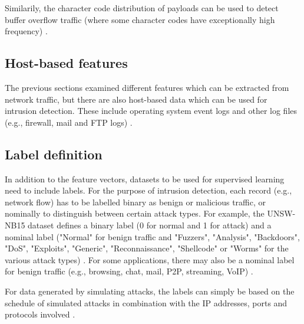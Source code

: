 \documentclass[conference]{IEEEtran}
\begin{document}
Similarily, the character code distribution of payloads can be used to detect buffer overflow traffic (where some character codes have exceptionally high frequency) \cite{waizumi2007}.

\subsection{Host-based features}

The previous sections examined different features which can be extracted from network traffic, but there are also host-based data which can be used for intrusion detection. These include operating system event logs \cite{Ids2018} and other log files (e.g., firewall, mail and FTP logs) \cite{abad2003}.

\subsection*{Label definition}

In addition to the feature vectors, datasets to be used for supervised learning need to include labels. For the purpose of intrusion detection, each record (e.g., network flow) has to be labelled  binary as benign or malicious traffic, or nominally to distinguish between certain attack types. For example, the UNSW-NB15 dataset defines a binary label (0 for normal and 1 for attack) and a nominal label ("Normal" for benign traffic and "Fuzzers", "Analysis", "Backdoors", "DoS", "Exploits", "Generic", "Reconnaissance", "Shellcode" or "Worms" for the various attack types) \cite{Nb2015}. For some applications, there may also be a nominal label for benign traffic (e.g., browsing, chat, mail, P2P, streaming, VoIP) \cite{lashkari2017} \cite{bagui2017}.

For data generated by simulating attacks, the labels can simply be based on the schedule of simulated attacks in combination with the IP addresses, ports and protocols involved \cite{Ids2018}.
\end{document}
